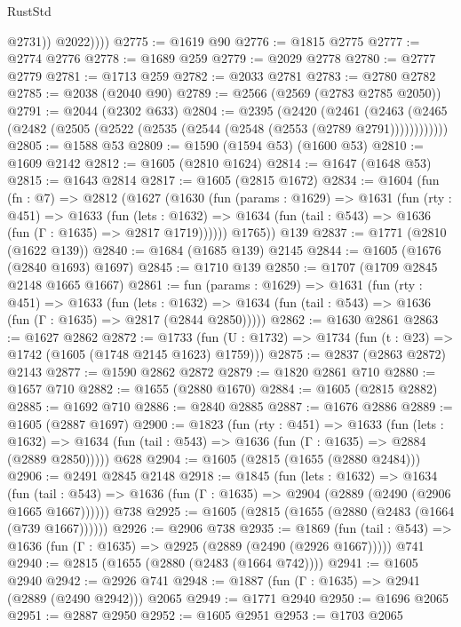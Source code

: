 \begin{lexlean}{RustStd}
\begin{coremodule}
{\begin{coremodule}
{{{{{{{{{{{{{{                @2731))
            @2022))))
@2775 := @1619 @90
@2776 := @1815 @2775
@2777 := @2774 @2776
@2778 := @1689 @259
@2779 := @2029 @2778
@2780 := @2777 @2779
@2781 := @1713 @259
@2782 := @2033 @2781
@2783 := @2780 @2782
@2785 := @2038 (@2040 @90)
@2789 := @2566 (@2569 (@2783 @2785 @2050))
@2791 := @2044 (@2302 @633)
@2804 := @2395
    (@2420
      (@2461 (@2463 (@2465 (@2482 (@2505 (@2522 (@2535 (@2544 (@2548 (@2553 (@2789 @2791))))))))))))
@2805 := @1588 @53
@2809 := @1590 (@1594 @53) (@1600 @53)
@2810 := @1609 @2142
@2812 := @1605 (@2810 @1624)
@2814 := @1647 (@1648 @53)
@2815 := @1643 @2814
@2817 := @1605 (@2815 @1672)
@2834 := @1604
    (fun (fn : @7) =>
    @2812
      (@1627
        (@1630
          (fun (params : @1629) =>
          @1631
            (fun (rty : @451) =>
            @1633
              (fun (lets : @1632) =>
              @1634 (fun (tail : @543) => @1636 (fun (Γ : @1635) => @2817 @1719))))))
        @1765))
    @139
@2837 := @1771 (@2810 (@1622 @139))
@2840 := @1684 (@1685 @139) @2145
@2844 := @1605 (@1676 (@2840 @1693) @1697)
@2845 := @1710 @139
@2850 := @1707 (@1709 @2845 @2148 @1665 @1667)
@2861 := fun (params : @1629) =>
  @1631
    (fun (rty : @451) =>
    @1633
      (fun (lets : @1632) =>
      @1634 (fun (tail : @543) => @1636 (fun (Γ : @1635) => @2817 (@2844 @2850)))))
@2862 := @1630 @2861
@2863 := @1627 @2862
@2872 := @1733 (fun (U : @1732) => @1734 (fun (t : @23) => @1742 (@1605 (@1748 @2145 @1623) @1759)))
@2875 := @2837 (@2863 @2872) @2143
@2877 := @1590 @2862 @2872
@2879 := @1820 @2861 @710
@2880 := @1657 @710
@2882 := @1655 (@2880 @1670)
@2884 := @1605 (@2815 @2882)
@2885 := @1692 @710
@2886 := @2840 @2885
@2887 := @1676 @2886
@2889 := @1605 (@2887 @1697)
@2900 := @1823
    (fun (rty : @451) =>
    @1633
      (fun (lets : @1632) =>
      @1634 (fun (tail : @543) => @1636 (fun (Γ : @1635) => @2884 (@2889 @2850)))))
    @628
@2904 := @1605 (@2815 (@1655 (@2880 @2484)))
@2906 := @2491 @2845 @2148
@2918 := @1845
    (fun (lets : @1632) =>
    @1634
      (fun (tail : @543) => @1636 (fun (Γ : @1635) => @2904 (@2889 (@2490 (@2906 @1665 @1667))))))
    @738
@2925 := @1605 (@2815 (@1655 (@2880 (@2483 (@1664 (@739 @1667))))))
@2926 := @2906 @738
@2935 := @1869
    (fun (tail : @543) => @1636 (fun (Γ : @1635) => @2925 (@2889 (@2490 (@2926 @1667)))))
    @741
@2940 := @2815 (@1655 (@2880 (@2483 (@1664 @742))))
@2941 := @1605 @2940
@2942 := @2926 @741
@2948 := @1887 (fun (Γ : @1635) => @2941 (@2889 (@2490 @2942))) @2065
@2949 := @1771 @2940
@2950 := @1696 @2065
@2951 := @2887 @2950
@2952 := @1605 @2951
@2953 := @1703 @2065
}}}}}}}}}}}}}}
\end{coremodule}}
\end{coremodule}
\end{lexlean}
